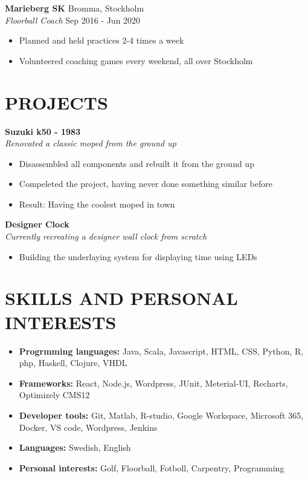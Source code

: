 \documentclass[a4paper,9pt]{extarticle}
\begin{document}
\noindent
\textbf{Marieberg SK} \hfill Bromma, Stockholm\\ %
\textit{Floorball Coach} \hfill Sep 2016 - Jun 2020  %
\begin{itemize}
    \item Planned and held practices 2-4 times a week 
    \item Volunteered coaching games every weekend, all over Stockholm 
\end{itemize}

\section*{PROJECTS}
\noindent
\textbf{Suzuki k50 - 1983} \hfill\\
\textit{Renovated a classic moped from the ground up} 
\begin{itemize}
    \item Disassembled all components and rebuilt it from the ground up
    \item Compeleted the project, having never done something similar before
    \item Result: Having the coolest moped in town
\end{itemize}

\noindent
\textbf{Designer Clock} \hfill\\ %
\textit{Currently recreating a designer wall clock from scratch} 
\begin{itemize}
    \item Building the underlaying system for displaying time using LEDs %
\end{itemize}

\section*{SKILLS AND PERSONAL INTERESTS}
\begin{itemize} 
    \item \textbf{Progrmming languages: } Java, Scala, Javascript, HTML, CSS, Python, R, php, Haskell, Clojure, VHDL
    \item \textbf{Frameworks: } React, Node.js, Wordpress, JUnit, Meterial-UI, Recharts, Optimizely CMS12
    \item \textbf{Developer tools: } Git, Matlab, R-studio, Google Workspace, Microsoft 365, Docker, VS code, Wordpress, Jenkins
    \item \textbf{Languages:} Swedish, English
    \item \textbf{Personal interests:} Golf, Floorball, Fotboll, Carpentry, Programming
\end{itemize}

\end{document}
